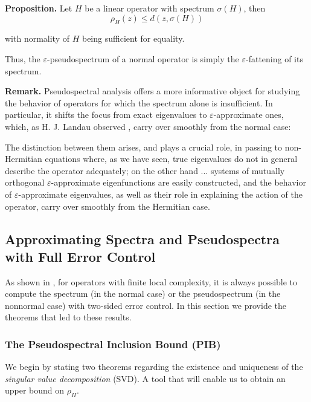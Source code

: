 \documentclass[11pt]{article}
\begin{document}
\textbf{Proposition.} Let $H$ be a linear operator with spectrum $\sigma(H)$, then
\begin{equation}
    \rho_H (z) \leq d(z, \sigma(H))
\end{equation}

with normality of $H$ being sufficient for equality.

Thus, the $\varepsilon$-pseudospectrum of a normal operator is simply the $\varepsilon$-fattening of its spectrum.

\textbf{Remark.} Pseudospectral analysis offers a more informative object for studying the behavior of operators for which the spectrum alone is insufficient. In particular, it shifts the focus from exact eigenvalues to $\varepsilon$-approximate ones, which, as H. J. Landau observed \cite{landau}, carry over smoothly from the normal case:
\begin{displayquote}
    The distinction between them arises, and plays a crucial role, in passing to non-Hermitian equations where, as we have seen, true eigenvalues do not in general describe the operator adequately; on the other hand ... systems of mutually orthogonal $\varepsilon$-approximate eigenfunctions are easily constructed, and the behavior of $\varepsilon$-approximate eigenvalues, as well as their role in explaining the action of the operator, carry over smoothly from the Hermitian case.
\end{displayquote}

\subsection{Approximating Spectra and Pseudospectra with Full Error Control}

As shown in \cite{paulhege2025}, for operators with finite local complexity, it is always possible to compute the spectrum (in the normal case) or the pseudospectrum (in the nonnormal case) with two-sided error control. In this section we provide the theorems that led to these results.

\subsubsection{The Pseudospectral Inclusion Bound (PIB)}

We begin by stating two theorems regarding the existence and uniqueness of the \textit{singular value decomposition} (SVD). A tool that will enable us to obtain an upper bound on $\rho_H$.
\end{document}
